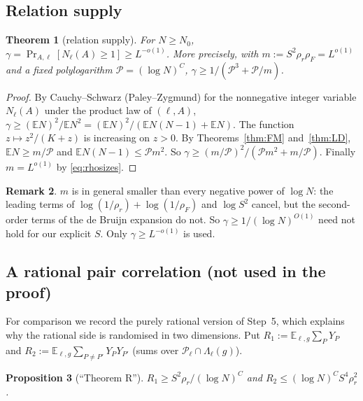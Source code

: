 \documentclass[11pt]{amsart}
\newtheorem{theorem}{Theorem}[section]
\newtheorem{proposition}[theorem]{Proposition}
\theoremstyle{definition}
\newtheorem{remark}[theorem]{Remark}
\newcommand{\cP}{\mathcal{P}}
\newcommand{\rr}{\rho_r}
\newcommand{\rF}{\rho_F}
\newcommand{\Ex}{\mathbb{E}}
\newcommand{\Prob}{\Pr}
\begin{document}
\subsection{Relation supply}

\begin{theorem}[relation supply]\label{thm:Dk}
For $N\ge N_0$, $\gamma=\Prob_{A,\ell}[N_\ell(A)\ge1]\ge L^{-o(1)}$. More precisely, with $m:=S^2\rr\rF=L^{o(1)}$ and a fixed polylogarithm $\mathcal P=(\log N)^{C}$,
$\gamma\ge1/(\mathcal P^3+\mathcal P/m)$.
\end{theorem}

\begin{proof}
By Cauchy--Schwarz (Paley--Zygmund) for the nonnegative integer variable $N_\ell(A)$ under the product law of $(\ell,A)$,
$\gamma\ge(\Ex N)^2/\Ex N^2=(\Ex N)^2/(\Ex N(N-1)+\Ex N)$. The function $z\mapsto z^2/(K+z)$ is increasing on $z>0$. By
Theorems~\ref{thm:FM} and~\ref{thm:LD}, $\Ex N\ge m/\mathcal P$ and $\Ex N(N-1)\le\mathcal Pm^2$. So
$\gamma\ge(m/\mathcal P)^2/(\mathcal Pm^2+m/\mathcal P)$. Finally $m=L^{o(1)}$ by \eqref{eq:rhosizes}.
\end{proof}

\begin{remark}
$m$ is in general smaller than every negative power of $\log N$: the leading terms of $\log(1/\rr)+\log(1/\rF)$ and $\log S^2$
cancel, but the second-order terms of the de Bruijn expansion do not. So $\gamma\ge1/(\log N)^{O(1)}$ need not hold for our
explicit $S$. Only $\gamma\ge L^{-o(1)}$ is used.
\end{remark}

\subsection{A rational pair correlation (not used in the proof)}

For comparison we record the purely rational version of Step~5, which explains why the rational side is randomised in two
dimensions. Put $R_1:=\Ex_{\ell,g}\sum_PY_P$ and $R_2:=\Ex_{\ell,g}\sum_{P\ne P'}Y_PY_{P'}$ (sums over $\cP_\ell\cap\Lambda_\ell(g)$).

\begin{proposition}[``Theorem R'']\label{prop:R}
$R_1\ge S^2\rr/(\log N)^C$ and $R_2\le(\log N)^CS^4\rr^2$.
\end{proposition}
\end{document}
